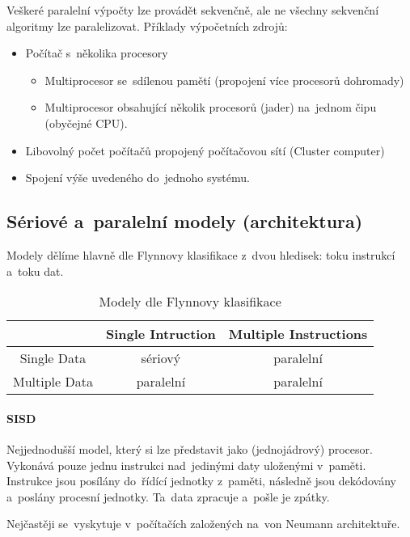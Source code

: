 Veškeré paralelní výpočty lze provádět sekvenčně, ale ne všechny sekvenční algoritmy lze paralelizovat. Příklady výpočetních zdrojů:
\begin{itemize}
	\item Počítač s~několika procesory
	      \begin{itemize}
		      \item Multiprocesor se~sdílenou pamětí (propojení více procesorů dohromady)
		      \item Multiprocesor obsahující několik procesorů (jader) na~jednom čipu (obyčejné CPU).
	      \end{itemize}
	\item Libovolný počet počítačů propojený počítačovou sítí (Cluster computer)
	\item Spojení výše uvedeného do~jednoho systému.
\end{itemize}

\subsection{Sériové a~paralelní modely (architektura)}

Modely dělíme hlavně dle Flynnovy klasifikace z~dvou hledisek: toku instrukcí a~toku dat.

\begin{table}[ht]
	\centering
	\caption{Modely dle Flynnovy klasifikace}

	\begin{tabular}{c|cc}
		{}            & Single Intruction & Multiple Instructions \\
		\hline
		Single Data   & sériový           & paralelní             \\
		Multiple Data & paralelní         & paralelní             \\
	\end{tabular}
\end{table}

\paragraph{SISD}

Nejjednodušší model, který si lze představit jako (jednojádrový) procesor. Vykonává pouze jednu instrukci nad~jedinými daty uloženými v~paměti. Instrukce jsou posílány do~řídící jednotky z~paměti, následně jsou dekódovány a~poslány procesní jednotky. Ta~data zpracuje a~pošle je zpátky.

Nejčastěji se~vyskytuje v~počítačích založených na~von Neumann architektuře.


